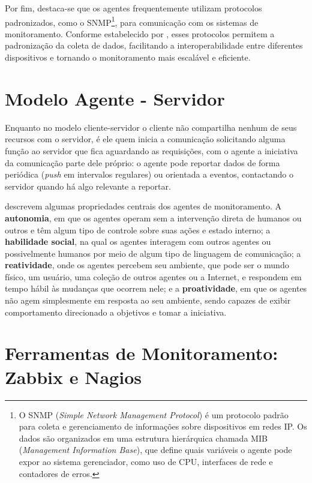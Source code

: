 \documentclass[
    12pt
    ,oneside
    ,a4paper
    ,chapter=TITLE
    ,section=TITLE
    ,sumario=abnt-6027-2012]{abntex2}
\begin{document}
Por fim, destaca-se que os agentes frequentemente utilizam protocolos padronizados, como o SNMP\footnote{O SNMP (\textit{Simple Network Management Protocol}) é um protocolo padrão para coleta e gerenciamento de informações sobre dispositivos em redes IP. Os dados são organizados em uma estrutura hierárquica chamada MIB (\textit{Management Information Base}), que define quais variáveis o agente pode expor ao sistema gerenciador, como uso de CPU, interfaces de rede e contadores de erros.}, para comunicação com os sistemas de monitoramento. Conforme estabelecido por , esses protocolos permitem a padronização da coleta de dados, facilitando a interoperabilidade entre diferentes dispositivos e tornando o monitoramento mais escalável e eficiente.

\section{Modelo Agente - Servidor}


Enquanto no modelo cliente-servidor o cliente não compartilha nenhum de seus recursos com o servidor, é ele quem inicia a comunicação solicitando alguma função ao servidor que fica aguardando as requisições, com o agente a iniciativa da comunicação parte dele próprio: o agente pode reportar dados de forma periódica (\textit{push} em intervalos regulares) ou orientada a eventos, contactando o servidor quando há algo relevante a reportar.

 descrevem algumas propriedades centrais dos agentes de monitoramento. A \textbf{autonomia}, em que os agentes operam sem a intervenção direta de humanos ou outros e têm algum tipo de controle sobre suas ações e estado interno; a \textbf{habilidade social}, na qual os agentes interagem com outros agentes ou possivelmente humanos por meio de algum tipo de linguagem de comunicação; a \textbf{reatividade}, onde os agentes percebem seu ambiente, que pode ser o mundo físico, um usuário, uma coleção de outros agentes ou a Internet, e respondem em tempo hábil às mudanças que ocorrem nele; e a \textbf{proatividade}, em que os agentes não agem simplesmente em resposta ao seu ambiente, sendo capazes de exibir comportamento direcionado a objetivos e tomar a iniciativa.

\section{Ferramentas de Monitoramento: Zabbix e Nagios}
\end{document}
